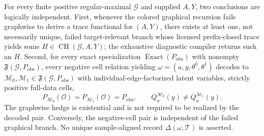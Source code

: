 For every finite positive regular-maximal \(\mathcal G\) and supplied \(A,Y\), two conclusions are logically independent. First, whenever the colored graphical recursion fails graphwise to derive a trace functional for \((A,Y)\), there exists at least one, not necessarily unique, failed target-relevant branch whose licensed prefix-closed trace yields some \(H\in\operatorname{CH}(\mathcal G,A,Y)\); the exhaustive diagnostic compiler returns such an \(H\). Second, for every exact specialization \(\operatorname{Exact}(P_{\mathrm{obs}})\) with nonempty \(\mathfrak F(\mathcal G,P_{\mathrm{obs}})\), every negative cell relation yielding \(\omega=(a,y,\theta^0,\theta^1)\) decodes to \(\mathcal M_0,\mathcal M_1\in\mathfrak F(\mathcal G,P_{\mathrm{obs}})\) with individual-edge-factorized latent variables, strictly positive full-data cells,
\[
P_{\mathcal M_0}(\mathcal O)=P_{\mathcal M_1}(\mathcal O)=P_{\mathrm{obs}},
\qquad
Q_a^{\mathcal M_0}(y)\neq Q_a^{\mathcal M_1}(y).
\]
The graphwise hedge is existential and is not required to be realized by the decoded pair. Conversely, the negative-cell pair is independent of the failed graphical branch. No unique sample-aligned record \(\Delta(\omega,\mathcal T)\) is asserted.